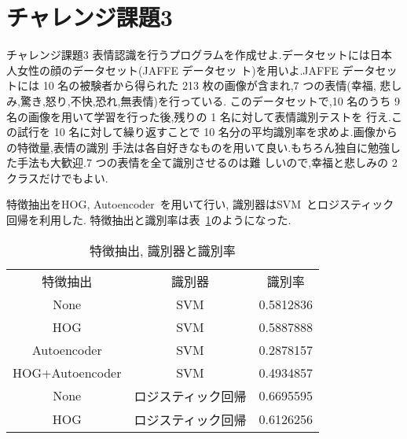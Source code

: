 \section{チャレンジ課題3}\label{section:challenge3}
\begin{itembox}{チャレンジ課題3}
  表情認識を行うプログラムを作成せよ.データセットには日本人女性の顔のデータセット(JAFFE データセッ ト)を用いよ.JAFFE データセットには 10 名の被験者から得られた 213 枚の画像が含まれ,7 つの表情(幸福, 悲しみ,驚き,怒り,不快,恐れ,無表情)を行っている.
  このデータセットで,10 名のうち 9 名の画像を用いて学習を行った後,残りの 1 名に対して表情識別テストを 行え.この試行を 10 名に対して繰り返すことで 10 名分の平均識別率を求めよ.画像からの特徴量,表情の識別 手法は各自好きなものを用いて良い.もちろん独自に勉強した手法も大歓迎.7 つの表情を全て識別させるのは難 しいので,幸福と悲しみの 2 クラスだけでもよい.
\end{itembox}

特徴抽出をHOG, Autoencoder~\cite{autoencoder}を用いて行い,
識別器はSVM~\cite{sklearn-svm}とロジスティック回帰を利用した.
特徴抽出と識別率は表~\ref{tbl:feature-extraction-score}のようになった.

\begin{table}[htbp]
  \begin{center}
    \begin{tabular}{ccc}
      特徴抽出 & 識別器 & 識別率 \\
      None & SVM & 0.5812836 \\
      HOG & SVM & 0.5887888  \\
      Autoencoder & SVM & 0.2878157 \\
      HOG+Autoencoder & SVM & 0.4934857  \\
      None & ロジスティック回帰 & 0.6695595 \\
      HOG & ロジスティック回帰 & 0.6126256 \\
    \end{tabular}
    \caption{特徴抽出, 識別器と識別率}
    \label{tbl:feature-extraction-score}
  \end{center}
\end{table}
